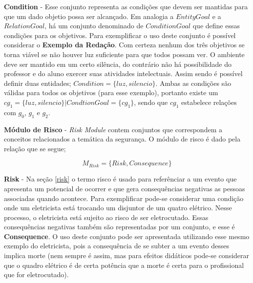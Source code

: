 \textbf{Condition} - Esse conjunto representa as condições que devem ser mantidas para que um dado objetio possa ser alcançado. 
Em analogia a $EntityGoal$ e a $RelationGoal$, há um conjunto denominado de $ConditionGoal$ que define essas condições 
para os objetivos. Para exemplificar o uso deste conjunto é possível considerar o \textbf{Exemplo da Redação}. Com certeza
nenhum dos três objetivos se torna viável se não houver luz suficiente para que todos possam ver. O ambiente deve ser mantido 
em um certo silência, do contrário não há possibilidade do professor e do aluno exercer suas atividades intelectuais. Assim sendo
é possível definir duas entidades; $Condition = \{ luz,silencio \}$. Ambas as condições são válidas para todos os objetivos (para esse
exemplo), portanto existe um $cg_1 = \{ luz,silencio \} | CondtionGoal = \{ cg_1 \}$, sendo que $cg_1$ estabelece relações com 
$g_0$, $g_1$ e $g_2$.

\textbf{Módulo de Risco} - \textit{Risk Module} contem conjuntos que correspondem a conceitos relacionados a temática da segurança.
O módulo de risco é dado pela relação que se segue;

\begin{equation}
    M_{Risk} = \{ Risk, Consequence \}
\end{equation}

\textbf{Risk} - Na seção \ref{risk} o termo risco é usado para referênciar a um evento que apresenta um potencial de ocorrer e que 
gera consequências negativas as pessoas associadas quando acontece. Para exemplificar pode-se considerar uma condição onde um eletricista 
está trocando um disjuntor de um quatro elétrico. Nesse processo, o eletricista está sujeito ao risco de ser eletrocutado. Essas 
consequências negativas também são representadas por um conjunto, e esse é \textbf{Consequence}. O uso deste conjunto pode ser 
apresentada utilizando esse mesmo exemplo do eletricista, pois a consequência de se subter a um evento desses implica morte (nem sempre é assim, 
mas para efeitos didáticos pode-se considerar que o quadro elétrico é de certa potência que a morte é certa para o profissional
que for eletrocutado).